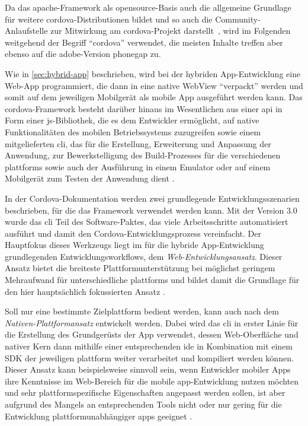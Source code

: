 Da das \gls{apache}-Framework als \gls{opensource}-Basis auch die allgemeine Grundlage für weitere \gls{cordova}-Distributionen bildet und so auch die Community-Anlaufstelle zur Mitwirkung am \gls{cordova}-Projekt darstellt~\cite{PhoneGap_Cordova_and_whats_in_a_name}, wird im Folgenden weitgehend der Begriff \enquote{\gls{cordova}} verwendet, die meisten Inhalte treffen aber ebenso auf die \gls{adobe}-Version \gls{phonegap} zu. 


Wie in \autoref{sec:hybrid-app} beschrieben, wird bei der hybriden App-Entwicklung eine Web-App programmiert, die dann in eine native WebView \enquote{verpackt} werden und somit auf dem jeweiligen Mobilgerät als mobile App ausgeführt werden kann. 
Das \gls{cordova}-Framework besteht darüber hinaus im Wesentlichen aus einer \gls{api} in Form einer \gls{js}-Bibliothek, die es dem Entwickler ermöglicht, auf native Funktionalitäten des mobilen Betriebssystems zuzugreifen sowie einem mitgelieferten \gls{cli}, das für die Erstellung, Erweiterung und Anpassung der Anwendung, zur Bewerkstelligung des Build-Prozesses für die verschiedenen \glspl{plattform} sowie auch der Ausführung in einem Emulator oder auf einem Mobilgerät zum Testen der Anwendung dient \cite{Cordova-Docs_Overview}.


In der Cordova-Dokumentation werden zwei grundlegende Entwicklungsszenarien beschrieben, für die das Framework verwendet werden kann. 
Mit der Version 3.0 wurde das \gls{cli} Teil des Software-Paktes, das viele Arbeitsschritte automatisiert ausführt und damit den Cordova-Entwicklungsprozess vereinfacht. 
Der Hauptfokus dieses Werkzeugs liegt im für die hybride App-Entwicklung grundlegenden Entwicklungsworkflows, dem \emph{Web-Ent\-wick\-lungs\-an\-satz}. %
Dieser Ansatz bietet die breiteste Plattformunterstützung bei möglichst geringem Mehraufwand für unterschiedliche \glspl{plattform} und bildet damit die Grundlage für den hier hauptsächlich fokussierten Ansatz \cite{Cordova-Docs_CLI}.

Soll nur eine bestimmte Zielplattform bedient werden, kann auch nach dem \emph{Nativen-Plattformansatz} entwickelt werden.
Dabei wird das \gls{cli} in erster Linie für die Erstellung des Grundgerüsts der App verwendet, dessen Web-Oberfläche und nativer Kern dann mithilfe einer entsprechenden \gls{ide} in Kombination mit einem SDK der jeweiligen \gls{plattform} weiter verarbeitet und kompiliert werden können. 
Dieser Ansatz kann beispielsweise sinnvoll sein, wenn Entwickler mobiler Apps ihre Kenntnisse im Web-Bereich für die mobile \gls{app}-Entwicklung nutzen möchten und sehr plattformspezifische Eigenschaften angepasst werden sollen, ist aber aufgrund des Mangels an entsprechenden Tools nicht oder nur gering für die Entwicklung plattformunabhängiger \glspl{app} geeignet \cite{Cordova-Docs_CLI}. 

